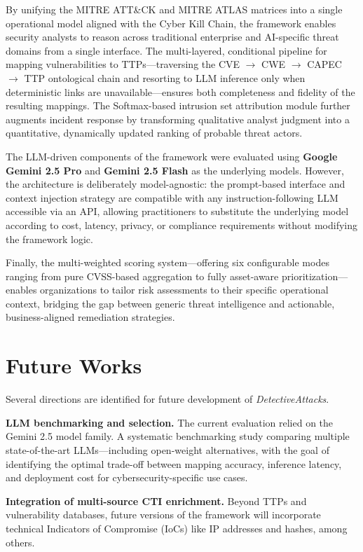 \documentclass[conference]{IEEEtran}
\begin{document}
By unifying the MITRE ATT\&CK and MITRE ATLAS matrices into a single operational model aligned with the Cyber Kill Chain, the framework enables security analysts to reason across traditional enterprise and AI-specific threat domains from a single interface. The multi-layered, conditional pipeline for mapping vulnerabilities to TTPs—traversing the CVE $\rightarrow$ CWE $\rightarrow$ CAPEC $\rightarrow$ TTP ontological chain and resorting to LLM inference only when deterministic links are unavailable—ensures both completeness and fidelity of the resulting mappings. The Softmax-based intrusion set attribution module further augments incident response by transforming qualitative analyst judgment into a quantitative, dynamically updated ranking of probable threat actors.

The LLM-driven components of the framework were evaluated using \textbf{Google Gemini 2.5 Pro} and \textbf{Gemini 2.5 Flash} as the underlying models. However, the architecture is deliberately model-agnostic: the prompt-based interface and context injection strategy are compatible with any instruction-following LLM accessible via an API, allowing practitioners to substitute the underlying model according to cost, latency, privacy, or compliance requirements without modifying the framework logic.

Finally, the multi-weighted scoring system—offering six configurable modes ranging from pure CVSS-based aggregation to fully asset-aware prioritization—enables organizations to tailor risk assessments to their specific operational context, bridging the gap between generic threat intelligence and actionable, business-aligned remediation strategies.

\section{Future Works}
\label{future_work}
Several directions are identified for future development of \textit{DetectiveAttacks}.

\textbf{LLM benchmarking and selection.} The current evaluation relied on the Gemini 2.5 model family. A systematic benchmarking study comparing multiple state-of-the-art LLMs—including open-weight alternatives, with the goal of identifying the optimal trade-off between mapping accuracy, inference latency, and deployment cost for cybersecurity-specific use cases.

\textbf{Integration of multi-source CTI enrichment.} Beyond TTPs and vulnerability databases, future versions of the framework will incorporate technical Indicators of Compromise (IoCs) like IP addresses and hashes, among others.
\end{document}
